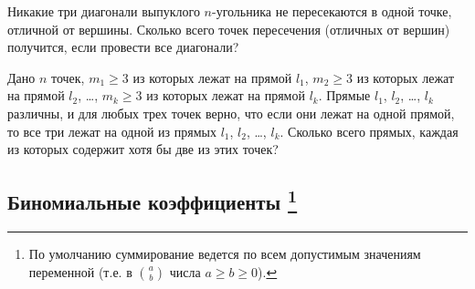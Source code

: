 \begin{problems}
\item
Никакие три диагонали выпуклого $n$-угольника не пересекаются в одной точке,
отличной от вершины.
Сколько всего точек пересечения (отличных от вершин) получится, если провести
все диагонали?

\item
Дано $n$ точек,
$m_1 \geq 3$ из которых лежат на прямой $l_1$,
$m_2 \geq 3$ из которых лежат на прямой $l_2$,
\ldots,
$m_k \geq 3$ из которых лежат на прямой $l_k$.
Прямые $l_1$, $l_2$, \ldots, $l_k$ различны, и для любых трех точек верно, что
если они лежат на одной прямой, то все три лежат на одной из прямых
$l_1$, $l_2$, \ldots, $l_k$.
Сколько всего прямых, каждая из которых содержит хотя бы две из этих точек?

\end{problems}

\subsection*{Биномиальные коэффициенты%
\footnote{По умолчанию суммирование ведется по всем допустимым значениям
переменной
(т.е. в ${\binom{a}{b}}$ числа $a \geq b \geq 0$).}}

\newcommand{\ds}{\displaystyle}

